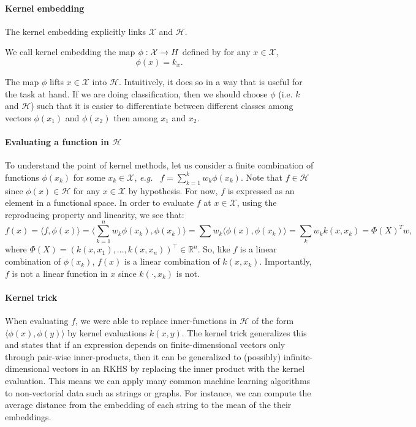 \paragraph{Kernel embedding}
The kernel embedding explicitly links $\mathcal X$ and $\mathcal H$.
\begin{mdframed}
\begin{definition}
We call kernel embedding the map $\phi: \mathcal X \to \mathbb \mathcal H$ defined by for any $x\in\mathcal X$,
$$ \phi(x) = k_x.$$
\end{definition}
\end{mdframed}

The map $\phi$ lifts $x\in\mathcal X$ into $\mathcal H$. Intuitively, it does so in a way that is useful for the task at hand. If we are doing classification, then we should choose $\phi$ (i.e. $k$ and $\mathcal H$) such that it is easier to differentiate between different classes among vectors $\phi(x_1)$ and $\phi(x_2)$ then among $x_1$ and $x_2$. %

\paragraph{Evaluating a function in $\mathcal H$}
To understand the point of kernel methods, let us consider a finite combination of functions $\phi(x_k)$ for some $x_k\in\mathcal X$, \emph{e.g.\ } $f= \sum_{k=1}^k w_k \phi(x_k)$. Note that $f\in\mathcal H$ since $\phi(x)\in\mathcal H$ for any $x\in\mathcal X$ by hypothesis. For now, $f$ is expressed as an element in a functional space. In order to evaluate $f$ at $x\in\mathcal X$, using the reproducing property and linearity, we see that:
$$f(x) = \langle f, \phi(x)\rangle = \langle \sum_{k=1}^n w_k\phi(x_k), \phi(x_k)\rangle= \sum w_k \langle \phi(x), \phi(x_k)\rangle = \sum_{k}w_k k(x, x_k)= \Phi(X)^Tw,$$
where $\Phi(X) = (k(x, x_1), \ldots, k(x, x_n))^\top\in\mathbb R^n$. So, like $f$ is a linear combination of $\phi(x_k)$, $f(x)$ is a linear combination of $k(x, x_k)$. Importantly, $f$ is not a linear function in $x$ since $k(\cdot, x_k)$ is not.

\paragraph{Kernel trick}
When evaluating $f$, we were able to replace inner-functions in $\mathcal H$ of the form $\langle \phi(x), \phi(y)\rangle$ by kernel evaluations $k(x, y)$. The kernel trick generalizes this and states that if an expression depends on finite-dimensional vectors only through pair-wise inner-products, then it can be generalized to (possibly) infinite-dimensional vectors in an RKHS by replacing the inner product with the kernel evaluation. This means we can apply many common machine learning algorithms to non-vectorial data such as strings or graphs. For instance, we can compute the average distance from the embedding of each string to the mean of the their embeddings.

